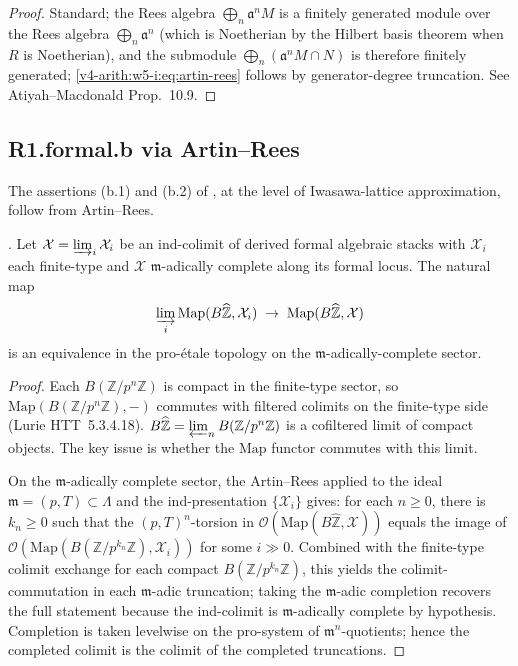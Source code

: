 \begin{proof}
Standard; the Rees algebra \(\bigoplus_{n}\mathfrak{a}^{n}M\) is a
finitely generated module over the Rees algebra
\(\bigoplus_{n}\mathfrak{a}^{n}\) (which is Noetherian by the
Hilbert basis theorem when \(R\) is Noetherian), and the submodule
\(\bigoplus_{n}(\mathfrak{a}^{n}M\cap N)\) is therefore finitely
generated; \eqref{v4-arith:w5-i:eq:artin-rees} follows by
generator-degree truncation. See Atiyah--Macdonald Prop.~10.9.
\end{proof}

\subsection{R1.formal.b via Artin--Rees}
\label{v4-arith:w5-i:R1-formal-b-closure}

The assertions (b.1) and (b.2) of
, at the level of
Iwasawa-lattice approximation, follow from Artin--Rees.

\begin{proposition}
\label{v4-arith:w5-i:prop:b2-closure}
\ClaimStatusProvedHere. Let \(\mathcal{X}=\varinjlim_{i}\mathcal{X}_{i}\)
be an ind-colimit of derived formal algebraic stacks with
\(\mathcal{X}_{i}\) each finite-type and \(\mathcal{X}\)
\(\mathfrak{m}\)-adically complete along its formal locus. The natural
map
\[
\varinjlim_{i}\mathrm{Map}(B\widehat{\mathbb{Z}},\mathcal{X}_{i})\;\to\;\mathrm{Map}(B\widehat{\mathbb{Z}},\mathcal{X})
\]
is an equivalence in the pro-\'etale topology on the
\(\mathfrak{m}\)-adically-complete sector.
\end{proposition}

\begin{proof}
Each \(B(\mathbb{Z}/p^{n}\mathbb{Z})\) is compact in the finite-type
sector, so \(\mathrm{Map}(B(\mathbb{Z}/p^{n}\mathbb{Z}),-)\) commutes
with filtered colimits on the finite-type side (Lurie HTT~5.3.4.18).
\(B\widehat{\mathbb{Z}}=\varprojlim_{n}B(\mathbb{Z}/p^{n}\mathbb{Z})\)
is a cofiltered limit of compact objects. The key issue is whether
the \(\mathrm{Map}\) functor commutes with this limit.

On the \(\mathfrak{m}\)-adically complete sector, the Artin--Rees
 applied to the ideal
\(\mathfrak{m}=(p,T)\subset\Lambda\) and the ind-presentation
\(\{\mathcal{X}_{i}\}\) gives: for each \(n\geq 0\), there is
\(k_{n}\geq 0\) such that the \((p,T)^{n}\)-torsion in
\(\mathcal{O}(\mathrm{Map}(B\widehat{\mathbb{Z}},\mathcal{X}))\)
equals the image of
\(\mathcal{O}(\mathrm{Map}(B(\mathbb{Z}/p^{k_{n}}\mathbb{Z}),\mathcal{X}_{i}))\)
for some \(i\gg 0\). Combined with the finite-type colimit exchange
for each compact \(B(\mathbb{Z}/p^{k_{n}}\mathbb{Z})\), this yields
the colimit-commutation in each \(\mathfrak{m}\)-adic truncation;
	taking the \(\mathfrak{m}\)-adic completion recovers the full
statement because the ind-colimit is
\(\mathfrak{m}\)-adically complete by hypothesis.
Completion is taken levelwise on the pro-system of
\(\mathfrak m^n\)-quotients; hence the completed colimit is the colimit
of the completed truncations.
\end{proof}


